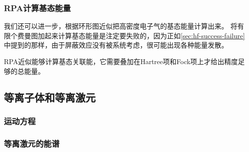 \subsubsection{RPA计算基态能量}

我们还可以进一步，根据环形图近似把高密度电子气的基态能量计算出来。
将有限个费曼图加起来计算基态能量是注定要失败的，因为正如\autoref{sec:hf-success-failure}中提到的那样，由于屏蔽效应没有被系统考虑，很可能出现各种能量发散。

RPA近似能够计算基态关联能，它需要叠加在Hartree项和Fock项上才给出精度足够的总能量。

\subsection{等离子体和等离激元}

\subsubsection{运动方程}

\subsubsection{等离激元的能谱}

